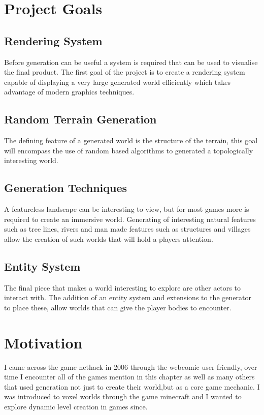 \section{Project Goals}
\subsection{Rendering System}
Before generation can be useful a system is required that can be used to 
visualise the final product. The first goal of the project is to create a
rendering system capable of displaying a very large generated world efficiently 
which takes advantage of modern graphics techniques.\\

\subsection{Random Terrain Generation}
The defining feature of a generated world is the structure of the terrain, this
goal will encompass the use of random based algorithms to generated a 
topologically interesting world.\\

\subsection{Generation Techniques}
A featureless landscape can be interesting to view, but for most games more is 
required to create an immersive world. Generating of interesting natural features
such as tree lines, rivers and man made features such as structures and villages
allow the creation of such worlds that will hold a players attention.

\subsection{Entity System}
The final piece that makes a world interesting to explore are other actors to 
interact with. The addition of an entity system and extensions to the generator
to place these, allow worlds that can give the player bodies to encounter.\\

\section{Motivation}
I came across the game nethack in 2006 through the webcomic user friendly, over time
I encounter all of the games mention in this chapter as well as many others that used
generation not just to create their world,but as a core game mechanic. I was 
introduced to voxel worlds through the game minecraft and I wanted to explore
dynamic level creation in games since. 


